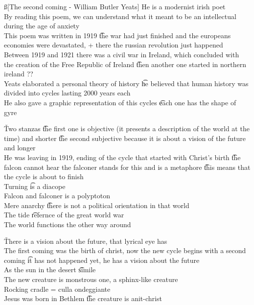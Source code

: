 \documentclass[12pt]{article}
\begin{document}
\ss[The second coming - William Butler Yeats]
He is a modernist irish poet \\
By reading this poem, we can understand what it meant to be an intellectual during the age of anxiety \\
This poem was written in 1919 \t the war had just finished and the europeans economies were devastated, + there the russian revolution just happened \\
Between 1919 and 1921 there was a civil war in Ireland, which concluded with the creation of the Free Republic of Ireland \t then another one started in northern ireland ?? \\
Yeats elaborated a personal theory of history \t he believed that human history was divided into cycles lasting 2000 years each \\
He also gave a graphic representation of this cycles \t each one has the shape of gyre

\v

Two stanzas \t the first one is objective (it presents a description of the world at the time) and shorter \t the second subjective because it is about a vision of the future and longer \\
He was leaving in 1919, ending of the cycle that started with Christ's birth \t the falcon cannot hear the falconer stands for this and is a metaphore \t this means that the cycle is about to finish \\
Turning \t is a diacope \\
Falcon and falconer is a polyptoton \\
Mere anarchy \t there is not a political orientation in that world \\
The tide \t refernce of the great world war \\
The world functions the other way around

\v

There is a vision about the future, that lyrical eye has \\
The first coming was the birth of christ, now the new cycle begins with a second coming \t it has not happened yet, he has a vision about the future \\
As the sun in the desert \t simile \\
The new creature is monstrous one, a sphinx-like creature \\
Rocking cradle = culla ondeggiante \\
Jesus was born in Bethlem \t the creature is anit-christ
\end{document}
